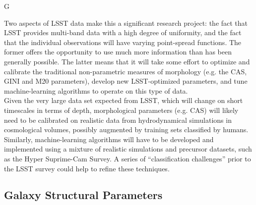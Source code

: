 {\begin{tasklist}{G}
\begin{task}
{Two aspects of LSST data make this a significant research project: the fact that LSST provides multi-band data with a high degree of uniformity, and the fact that the individual observations will have varying point-spread functions. The former offers the opportunity to use much more information than has been generally possible. The latter means that it will take some effort to optimize and calibrate the traditional non-parametric measures of morphology (e.g. the CAS, GINI and M20 parameters), develop new LSST-optimized parameters, and tune machine-learning algorithms to operate on this type of data. 
\\
Given the very large data set expected from LSST, which will change on short timescales in terms of depth, morphological parameters (e.g. CAS) will likely need to be calibrated on realistic data from hydrodynamical simulations in cosmological volumes, possibly augmented by training sets classified by humans. Similarly, machine-learning algorithms will have to be developed and implemented using a mixture of realistic simulations and precursor datasets, such as the Hyper Suprime-Cam Survey. A series of ``classification challenges'' prior to the LSST survey could help to refine these techniques. 
}
~\\
\end{task}


\subsection{Galaxy Structural Parameters}


\end{tasklist}}
